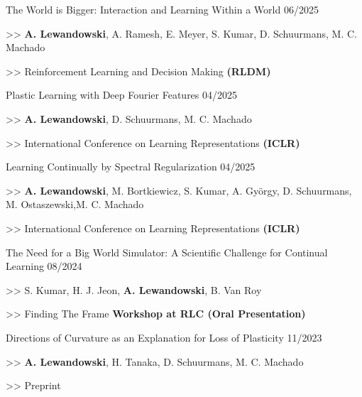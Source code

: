 \begin{cventries}


    \pubentry
    {The World is Bigger: Interaction and Learning Within a World}
    {06/2025}
    {
      \begin{cvitems}
        \item[>>] \textbf{A. Lewandowski}, A. Ramesh, E. Meyer, S. Kumar, D. Schuurmans, M. C. Machado
    	\item[>>] Reinforcement Learning and Decision Making \textbf{(RLDM)}
      \end{cvitems}
    }

    \pubentry
    {Plastic Learning with Deep Fourier Features}
    {04/2025}
    {
      \begin{cvitems}
        \item[>>] \textbf{A. Lewandowski}, D. Schuurmans, M. C. Machado
    	\item[>>] International Conference on Learning Representations \textbf{(ICLR)}
      \end{cvitems}
    }

    \pubentry
    {Learning Continually by Spectral Regularization}
    {04/2025}
    {
      \begin{cvitems}
        \item[>>] \textbf{A. Lewandowski}, M. Bortkiewicz, S. Kumar, A. György, D. Schuurmans, M. Ostaszewski,\newline M. C. Machado
    	\item[>>] International Conference on Learning Representations \textbf{(ICLR)}
      \end{cvitems}
    }


    \pubentry
    {The Need for a Big World Simulator: A Scientific Challenge for Continual Learning}
    {08/2024}
    {
      \begin{cvitems}
        \item[>>] S. Kumar, H. J. Jeon, \textbf{A. Lewandowski}, B. Van Roy
    	\item[>>] Finding The Frame \textbf{Workshop at RLC (Oral Presentation)}
      \end{cvitems}
    }

    \pubentry
    {Directions of Curvature as an Explanation for Loss of Plasticity}
    {11/2023}
    {
      \begin{cvitems}
        \item[>>] \textbf{A. Lewandowski}, H. Tanaka, D. Schuurmans, M. C. Machado
    	\item[>>] Preprint
      \end{cvitems}
    }


\end{cventries}
